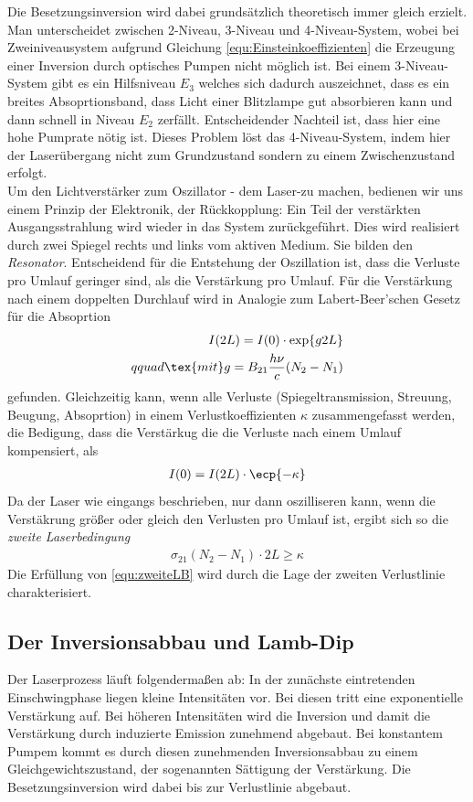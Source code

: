\documentclass[a4paper,twoside,final]{article}
\begin{document}
Die Besetzungsinversion wird dabei grundsätzlich theoretisch immer gleich erzielt. Man unterscheidet zwischen 2-Niveau, 3-Niveau und 4-Niveau-System, wobei bei Zweiniveausystem aufgrund Gleichung \ref{equ:Einsteinkoeffizienten} die Erzeugung einer Inversion durch optisches Pumpen nicht möglich ist. Bei einem 3-Niveau-System gibt es ein Hilfsniveau $E_3$ welches sich dadurch auszeichnet, dass es ein breites Absoprtionsband, dass Licht einer Blitzlampe gut absorbieren kann und dann schnell in Niveau $E_2$ zerfällt. Entscheidender Nachteil ist, dass hier eine hohe Pumprate nötig ist. Dieses Problem löst das 4-Niveau-System, indem hier der Laserübergang nicht zum Grundzustand sondern zu einem Zwischenzustand erfolgt. \\
Um den Lichtverstärker zum Oszillator - dem Laser-zu machen, bedienen wir uns einem Prinzip der Elektronik, der Rückkopplung: Ein Teil der verstärkten Ausgangsstrahlung wird wieder in das System zurückgeführt. Dies wird realisiert durch zwei Spiegel rechts und links vom aktiven Medium. Sie bilden den \textit{Resonator}. Entscheidend für die Entstehung der Oszillation ist, dass die Verluste pro Umlauf geringer sind, als die Verstärkung pro Umlauf. Für die Verstärkung nach einem doppelten Durchlauf wird in Analogie zum Labert-Beer'schen Gesetz für die Absoprtion
\begin{align}
  I(2L)=I(0)\cdot \exp{g2L} \\qquad \tex{mit} g = B_{21} \frac{h\nu}{c} (N_2-N_1)
\end{align}
gefunden. Gleichzeitig kann, wenn alle Verluste (Spiegeltransmission, Streuung, Beugung, Absoprtion) in einem Verlustkoeffizienten $\kappa$ zusammengefasst werden, die Bedigung, dass die Verstärkug die die Verluste nach einem Umlauf kompensiert, als
\begin{align}
  I(0)=I(2L)\cdot \ecp{-\kappa}
\end{align}
Da der Laser wie eingangs beschrieben, nur dann oszilliseren kann, wenn die Verstäkrung größer oder gleich den Verlusten pro Umlauf ist, ergibt sich so die \textit{zweite Laserbedingung}
\begin{align}
  \sigma_{21}(N_2-N_1)\cdot2L \geq \kappa
  \label{equ:zweiteLB}
\end{align}
Die Erfüllung von \ref{equ:zweiteLB} wird durch die Lage der zweiten Verlustlinie charakterisiert.


\subsection{Der Inversionsabbau und Lamb-Dip}
 Der Laserprozess läuft folgendermaßen ab: In der zunächste eintretenden Einschwingphase liegen kleine Intensitäten vor. Bei diesen tritt eine exponentielle Verstärkung auf. Bei höheren Intensitäten wird die Inversion und damit die Verstärkung durch induzierte Emission zunehmend abgebaut. Bei konstantem Pumpem kommt es durch diesen zunehmenden Inversionsabbau zu einem Gleichgewichtszustand, der sogenannten Sättigung der Verstärkung. Die Besetzungsinversion wird dabei bis zur Verlustlinie abgebaut. \\
\end{document}
